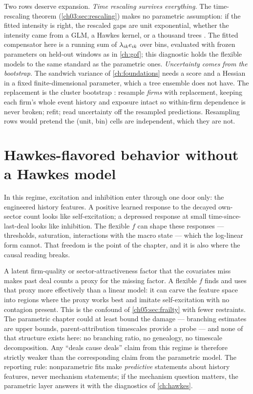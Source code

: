 Two rows deserve expansion. \emph{Time rescaling survives everything.}
The time-rescaling theorem (\cref{ch03:sec:rescaling}) makes no
parametric assumption: if the fitted intensity is right, the rescaled
gaps are unit exponential, whether the intensity came from a GLM, a
Hawkes kernel, or a thousand trees \citep{brown2002,ogata1988}. The
fitted compensator here is a running sum of $\lambda_{ik} e_{ik}$ over
bins, evaluated with frozen parameters on held-out windows as in
\cref{ch:gof}; this diagnostic holds the flexible models to the same
standard as the parametric ones. \emph{Uncertainty comes from the
bootstrap.} The sandwich variance of \cref{ch:foundations} needs a score
and a Hessian in a fixed finite-dimensional parameter, which a tree
ensemble does not have. The replacement is the cluster bootstrap
\citep{efron1994}: resample \emph{firms} with replacement, keeping each
firm's whole event history and exposure intact so within-firm dependence
is never broken; refit; read uncertainty off the resampled predictions.
Resampling rows would pretend the (unit, bin) cells are independent,
which they are not.

\section{Hawkes-flavored behavior without a Hawkes
model}\label{chnp:sec:imitation}

In this regime, excitation and inhibition enter through one door only:
the engineered history features. A positive learned response to the
decayed own-sector count looks like self-excitation; a depressed
response at small time-since-last-deal looks like inhibition. The
flexible $f$ can shape these responses --- thresholds, saturation,
interactions with the macro state --- which the log-linear form cannot.
That freedom is the point of the chapter, and it is also where the
causal reading breaks.

\begin{warning}\label{warn:chnp:contagion}
A latent firm-quality or sector-attractiveness factor that the
covariates miss makes past deal counts a proxy for the missing factor.
A flexible $f$ finds and uses that proxy more effectively than a linear
model: it can carve the feature space into regions where the proxy works
best and imitate self-excitation with no contagion present. This is the
confound of \cref{ch05:sec:frailty} with fewer restraints. The
parametric chapter could at least bound the damage --- branching
estimates are upper bounds, parent-attribution timescales provide a
probe --- and none of that structure exists here: no branching ratio, no
genealogy, no timescale decomposition. Any ``deals cause deals'' claim
from this regime is therefore strictly weaker than the corresponding
claim from the parametric model. The reporting rule: nonparametric fits
make \emph{predictive} statements about history features, never
mechanism statements; if the mechanism question matters, the parametric
layer answers it with the diagnostics of \cref{ch:hawkes}.
\end{warning}

